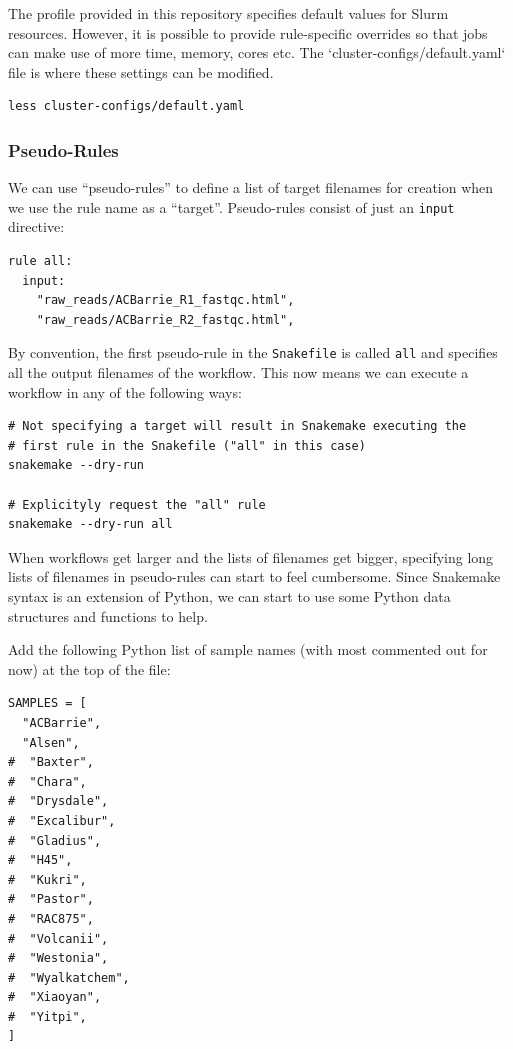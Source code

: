 The profile provided in this repository specifies default values for Slurm resources.
However, it is possible to provide rule-specific overrides so that jobs can make use of more time, memory, cores etc.
The `cluster-configs/default.yaml` file is where these settings can be modified.

\begin{lstlisting}
less cluster-configs/default.yaml
\end{lstlisting}

\subsubsection{Pseudo-Rules}

We can use ``pseudo-rules'' to define a list of target filenames for creation when we use the rule name as a ``target''.
Pseudo-rules consist of just an \texttt{input} directive:

\begin{lstlisting}
rule all:
  input:
    "raw_reads/ACBarrie_R1_fastqc.html",
    "raw_reads/ACBarrie_R2_fastqc.html",
\end{lstlisting}

By convention, the first pseudo-rule in the \texttt{Snakefile} is called \texttt{all} and specifies all the output filenames of the workflow.
This now means we can execute a workflow in any of the following ways:

\begin{lstlisting}
# Not specifying a target will result in Snakemake executing the
# first rule in the Snakefile ("all" in this case)
snakemake --dry-run

# Explicityly request the "all" rule
snakemake --dry-run all
\end{lstlisting}

When workflows get larger and the lists of filenames get bigger, specifying long lists of filenames in pseudo-rules can start to feel cumbersome.
Since Snakemake syntax is an extension of Python, we can start to use some Python data structures and functions to help.

Add the following Python list of sample names (with most commented out for now) at the top of the file:

\begin{lstlisting}
SAMPLES = [
  "ACBarrie",
  "Alsen",
#  "Baxter",
#  "Chara",
#  "Drysdale",
#  "Excalibur",
#  "Gladius",
#  "H45",
#  "Kukri",
#  "Pastor",
#  "RAC875",
#  "Volcanii",
#  "Westonia",
#  "Wyalkatchem",
#  "Xiaoyan",
#  "Yitpi",
]
\end{lstlisting}

